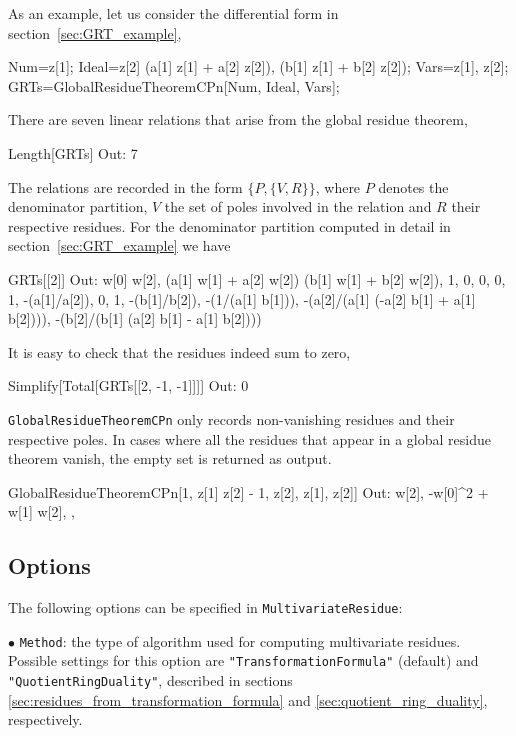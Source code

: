 \documentclass[dvipsnames,preprint,12pt,sort&compress]{elsarticle}
\newcommand{\Math}[1]
{\lstinline[style=Mathematica,breaklines=false,basicstyle=\small \ttfamily\null]~#1~}
\begin{document}
As an example, let us consider the differential form in section~\ref{sec:GRT_example},
\begin{CodeSample}
Num=z[1];
Ideal={z[2] (a[1] z[1] + a[2] z[2]), (b[1] z[1] + b[2] z[2])};
Vars={z[1], z[2]};
GRTs=GlobalResidueTheoremCPn[Num, Ideal, Vars];
\end{CodeSample}
There are seven linear relations that arise from the global residue theorem,
\begin{CodeSample}
Length[GRTs]
Out: 7
\end{CodeSample}
The relations are recorded in the form $\{ P, \{ V, R \} \}$,
where $P$ denotes the denominator partition, $V$ the set of poles
involved in the relation and $R$ their respective residues.
For the denominator partition computed in detail in section~\ref{sec:GRT_example}
we have
\begin{CodeSample}
GRTs[[2]]
Out: {{w[0] w[2], (a[1] w[1] + a[2] w[2]) (b[1] w[1] + b[2] w[2])}, {{{1, 0, 0}, {0, 1, -(a[1]/a[2])}, {0, 1, -(b[1]/b[2])}}, {-(1/(a[1] b[1])), -(a[2]/(a[1] (-a[2] b[1] + a[1] b[2]))), -(b[2]/(b[1] (a[2] b[1] - a[1] b[2])))}}}
\end{CodeSample}
It is easy to check that the residues indeed sum to zero,
\begin{CodeSample}
Simplify[Total[GRTs[[2, -1, -1]]]]
Out: 0
\end{CodeSample}

\Math{GlobalResidueTheoremCPn} only records non-vanishing residues and
their respective poles. In cases where all the residues that appear
in a global residue theorem vanish, the empty set is returned as output.
\begin{CodeSample}
GlobalResidueTheoremCPn[1, {z[1] z[2] - 1, z[2]}, {z[1], z[2]}]
Out: {{{w[2], -w[0]^2 + w[1] w[2]}, {{}, {}}}}
\end{CodeSample}



\subsection{Options}
\label{sec:options}
The following options can be specified in \Math{MultivariateResidue}:

\vspace{2mm}\noindent$\bullet$
\Math{Method}: the type of algorithm used for computing multivariate residues.
Possible settings for this option are \Math{"TransformationFormula"} (default) and \Math{"QuotientRingDuality"}, described in sections \ref{sec:residues_from_transformation_formula} and \ref{sec:quotient_ring_duality}, respectively.
\end{document}
